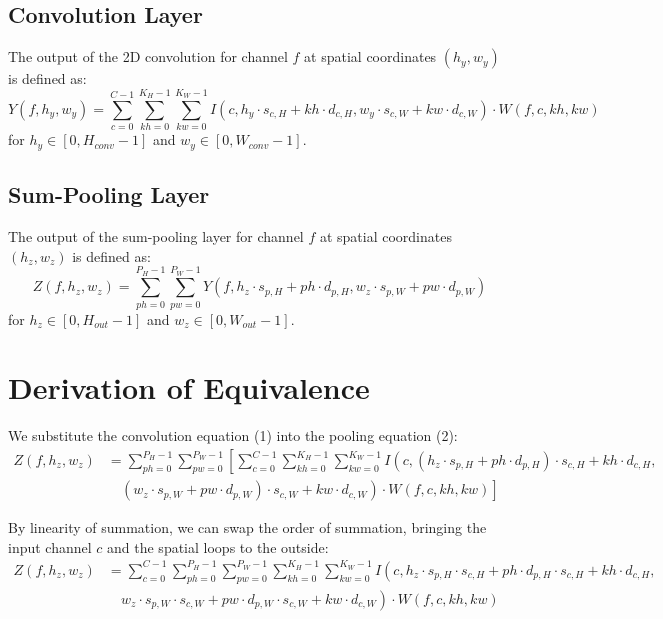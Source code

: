 \documentclass{article}
\begin{document}
\subsection{Convolution Layer}
The output of the 2D convolution for channel $f$ at spatial coordinates $(h_y, w_y)$ is defined as:
\begin{equation}
    Y(f, h_y, w_y) = \sum_{c=0}^{C-1} \sum_{kh=0}^{K_H-1} \sum_{kw=0}^{K_W-1} I(c, h_y \cdot s_{c,H} + kh \cdot d_{c,H}, w_y \cdot s_{c,W} + kw \cdot d_{c,W}) \cdot W(f, c, kh, kw)
\end{equation}
for $h_y \in [0, H_{conv}-1]$ and $w_y \in [0, W_{conv}-1]$.

\subsection{Sum-Pooling Layer}
The output of the sum-pooling layer for channel $f$ at spatial coordinates $(h_z, w_z)$ is defined as:
\begin{equation}
    Z(f, h_z, w_z) = \sum_{ph=0}^{P_H-1} \sum_{pw=0}^{P_W-1} Y(f, h_z \cdot s_{p,H} + ph \cdot d_{p,H}, w_z \cdot s_{p,W} + pw \cdot d_{p,W})
\end{equation}
for $h_z \in [0, H_{out}-1]$ and $w_z \in [0, W_{out}-1]$.

\section{Derivation of Equivalence}
We substitute the convolution equation (1) into the pooling equation (2):
\begin{align}
    Z(f, h_z, w_z) &= \sum_{ph=0}^{P_H-1} \sum_{pw=0}^{P_W-1} \left[ \sum_{c=0}^{C-1} \sum_{kh=0}^{K_H-1} \sum_{kw=0}^{K_W-1} I\left(c, (h_z \cdot s_{p,H} + ph \cdot d_{p,H}) \cdot s_{c,H} + kh \cdot d_{c,H}, \right. \right. \nonumber \\
    &\quad \left. \left. (w_z \cdot s_{p,W} + pw \cdot d_{p,W}) \cdot s_{c,W} + kw \cdot d_{c,W}\right) \cdot W(f, c, kh, kw) \right]
\end{align}

By linearity of summation, we can swap the order of summation, bringing the input channel $c$ and the spatial loops to the outside:
\begin{align}
    Z(f, h_z, w_z) &= \sum_{c=0}^{C-1} \sum_{ph=0}^{P_H-1} \sum_{pw=0}^{P_W-1} \sum_{kh=0}^{K_H-1} \sum_{kw=0}^{K_W-1} I\left(c, h_z \cdot s_{p,H} \cdot s_{c,H} + ph \cdot d_{p,H} \cdot s_{c,H} + kh \cdot d_{c,H}, \right. \nonumber \\
    &\quad \left. w_z \cdot s_{p,W} \cdot s_{c,W} + pw \cdot d_{p,W} \cdot s_{c,W} + kw \cdot d_{c,W}\right) \cdot W(f, c, kh, kw)
\end{align}
\end{document}
